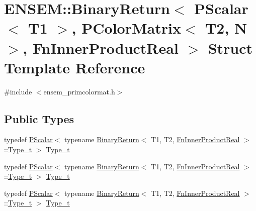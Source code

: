 \hypertarget{structENSEM_1_1BinaryReturn_3_01PScalar_3_01T1_01_4_00_01PColorMatrix_3_01T2_00_01N_01_4_00_01FnInnerProductReal_01_4}{}\section{E\+N\+S\+EM\+:\+:Binary\+Return$<$ P\+Scalar$<$ T1 $>$, P\+Color\+Matrix$<$ T2, N $>$, Fn\+Inner\+Product\+Real $>$ Struct Template Reference}
\label{structENSEM_1_1BinaryReturn_3_01PScalar_3_01T1_01_4_00_01PColorMatrix_3_01T2_00_01N_01_4_00_01FnInnerProductReal_01_4}


{\ttfamily \#include $<$ensem\+\_\+primcolormat.\+h$>$}

\subsection*{Public Types}
\begin{DoxyCompactItemize}
\item 
typedef \mbox{\hyperlink{classENSEM_1_1PScalar}{P\+Scalar}}$<$ typename \mbox{\hyperlink{structENSEM_1_1BinaryReturn}{Binary\+Return}}$<$ T1, T2, \mbox{\hyperlink{structENSEM_1_1FnInnerProductReal}{Fn\+Inner\+Product\+Real}} $>$\+::\mbox{\hyperlink{structENSEM_1_1BinaryReturn_3_01PScalar_3_01T1_01_4_00_01PColorMatrix_3_01T2_00_01N_01_4_00_01FnInnerProductReal_01_4_a11d39ff117f9fcafe7d0812201c9c496}{Type\+\_\+t}} $>$ \mbox{\hyperlink{structENSEM_1_1BinaryReturn_3_01PScalar_3_01T1_01_4_00_01PColorMatrix_3_01T2_00_01N_01_4_00_01FnInnerProductReal_01_4_a11d39ff117f9fcafe7d0812201c9c496}{Type\+\_\+t}}
\item 
typedef \mbox{\hyperlink{classENSEM_1_1PScalar}{P\+Scalar}}$<$ typename \mbox{\hyperlink{structENSEM_1_1BinaryReturn}{Binary\+Return}}$<$ T1, T2, \mbox{\hyperlink{structENSEM_1_1FnInnerProductReal}{Fn\+Inner\+Product\+Real}} $>$\+::\mbox{\hyperlink{structENSEM_1_1BinaryReturn_3_01PScalar_3_01T1_01_4_00_01PColorMatrix_3_01T2_00_01N_01_4_00_01FnInnerProductReal_01_4_a11d39ff117f9fcafe7d0812201c9c496}{Type\+\_\+t}} $>$ \mbox{\hyperlink{structENSEM_1_1BinaryReturn_3_01PScalar_3_01T1_01_4_00_01PColorMatrix_3_01T2_00_01N_01_4_00_01FnInnerProductReal_01_4_a11d39ff117f9fcafe7d0812201c9c496}{Type\+\_\+t}}
\item 
typedef \mbox{\hyperlink{classENSEM_1_1PScalar}{P\+Scalar}}$<$ typename \mbox{\hyperlink{structENSEM_1_1BinaryReturn}{Binary\+Return}}$<$ T1, T2, \mbox{\hyperlink{structENSEM_1_1FnInnerProductReal}{Fn\+Inner\+Product\+Real}} $>$\+::\mbox{\hyperlink{structENSEM_1_1BinaryReturn_3_01PScalar_3_01T1_01_4_00_01PColorMatrix_3_01T2_00_01N_01_4_00_01FnInnerProductReal_01_4_a11d39ff117f9fcafe7d0812201c9c496}{Type\+\_\+t}} $>$ \mbox{\hyperlink{structENSEM_1_1BinaryReturn_3_01PScalar_3_01T1_01_4_00_01PColorMatrix_3_01T2_00_01N_01_4_00_01FnInnerProductReal_01_4_a11d39ff117f9fcafe7d0812201c9c496}{Type\+\_\+t}}
\end{DoxyCompactItemize}


